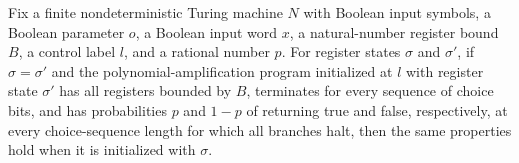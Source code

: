 \begin{lemma}
\label{Randomized.PolyAmp.PS.of_eq}
\leanok
{}
Fix a finite nondeterministic Turing machine $N$ with Boolean input symbols, a Boolean
parameter $o$, a Boolean input word $x$, a natural-number register bound $B$, a control
label $l$, and a rational number $p$. For register states $\sigma$ and $\sigma'$, if
$\sigma=\sigma'$ and the polynomial-amplification program initialized at $l$ with
register state $\sigma'$ has all registers bounded by $B$, terminates for every sequence
of choice bits, and has probabilities $p$ and $1-p$ of returning true and false,
respectively, at every choice-sequence length for which all branches halt, then the same
properties hold when it is initialized with $\sigma$.
\end{lemma}
